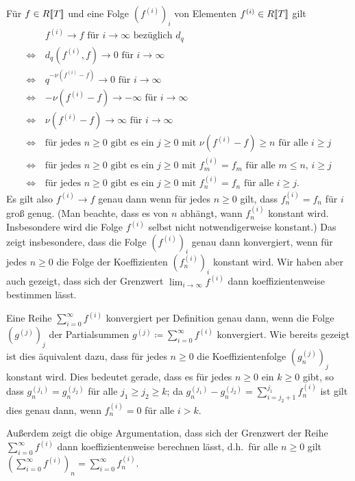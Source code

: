 \documentclass[a4paper, 10pt, numbers=noenddot]{scrartcl}
\begin{document}
Für $f \in R[\![T]\!]$ und eine Folge $(f^{(i)})_i$ von Elementen $f^{(i)} \in R[\![T]\!]$ gilt
\begin{align*}
      &\, \text{$f^{(i)} \to f$ für $i \to \infty$ bezüglich $d_q$} \\
  \iff&\, \text{$d_q(f^{(i)}, f) \to 0$ für $i \to \infty$} \\
  \iff&\, \text{$q^{-\nu(f^{(i)} - f)} \to 0$ für $i \to \infty$} \\
  \iff&\, \text{$-\nu(f^{(i)} - f) \to -\infty$ für $i \to \infty$} \\
  \iff&\, \text{$\nu(f^{(i)} - f) \to \infty$ für $i \to \infty$} \\
  \iff&\, \text{für jedes $n \geq 0$ gibt es ein $j \geq 0$ mit $\nu(f^{(i)} - f) \geq n$ für alle $i \geq j$}  \\
  \iff&\, \text{für jedes $n \geq 0$ gibt es ein $j \geq 0$ mit $f^{(i)}_m = f_m$ für alle $m \leq n$, $i \geq j$}  \\
  \iff&\, \text{für jedes $n \geq 0$ gibt es ein $j \geq 0$ mit $f^{(i)}_n = f_n$ für alle $i \geq j$}.
\end{align*}
Es gilt also $f^{(i)} \to f$ genau dann wenn für jedes $n \geq 0$ gilt, dass $f^{(i)}_n = f_n$ für $i$ groß genug.
(Man beachte, dass es von $n$ abhängt, wann $f^{(i)}_n$ konstant wird.
Insbesondere wird die Folge $f^{(i)}$ selbst nicht notwendigerweise konstant.)
Das zeigt insbesondere, dass die Folge $(f^{(i)})_i$ genau dann konvergiert, wenn für jedes $n \geq 0$ die Folge der Koeffizienten $(f^{(i)}_n)_i$ konstant wird.
Wir haben aber auch gezeigt, dass sich der Grenzwert $\lim_{i \to \infty} f^{(i)}$ dann koeffizientenweise bestimmen lässt.

Eine Reihe $\sum_{i = 0}^\infty f^{(i)}$ konvergiert per Definition genau dann, wenn die Folge $(g^{(j)})_j$ der Partialsummen $g^{(j)} \coloneqq \sum_{i=0}^\infty f^{(i)}$ konvergiert.
Wie bereits gezeigt ist dies äquivalent dazu, dass für jedes $n \geq 0$ die Koeffizientenfolge $(g^{(j)}_n)_j$ konstant wird.
Dies bedeutet gerade, dass es für jedes $n \geq 0$ ein $k \geq 0$ gibt, so dass $g^{(j_1)}_n = g^{(j_2)}_n$ für alle $j_1 \geq j_2 \geq k$;
da $g^{(j_1)}_n - g^{(j_2)}_n = \sum_{i = j_2 + 1}^{j_1} f^{(i)}_n$ ist gilt dies genau dann, wenn $f^{(i)}_n = 0$ für alle $i > k$.

Außerdem zeigt die obige Argumentation, dass sich der Grenzwert der Reihe $\sum_{i=0}^\infty f^{(i)}$ dann koeffizientenweise berechnen lässt, d.h.\ für alle $n \geq 0$ gilt $(\sum_{i=0}^\infty f^{(i)})_n = \sum_{i=0}^\infty f^{(i)}_n$.
\end{document}
